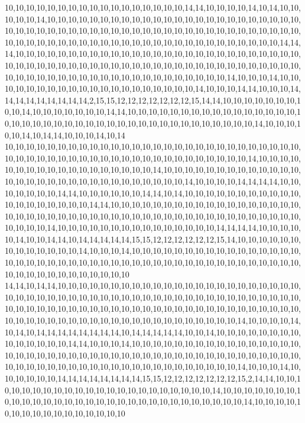 10,10,10,10,10,10,10,10,10,10,10,10,10,10,10,10,10,14,14,10,10,10,10,14,10,14,10,10,10,10,10,14,10,10,10,10,10,10,10,10,10,10,10,10,10,10,10,10,10,10,10,10,10,10,10,10,10,10,10,10,10,10,10,10,10,10,10,10,10,10,10,10,10,10,10,10,10,10,10,10,10,10,10,10,10,10,10,10,10,10,10,10,10,10,10,10,10,10,10,10,10,10,10,10,10,10,10,10,10,10,14,14,14,10,10,10,10,10,10,10,10,10,10,10,10,10,10,10,10,10,10,10,10,10,10,10,10,10,10,10,10,10,10,10,10,10,10,10,10,10,10,10,10,10,10,10,10,10,10,10,10,10,10,10,10,10,10,10,10,10,10,10,10,10,10,10,10,10,10,10,10,10,10,10,10,10,10,10,10,14,10,10,10,14,10,10,10,10,10,10,10,10,10,10,10,10,10,10,10,10,10,10,10,10,14,10,10,10,14,14,10,10,10,14,14,14,14,14,14,14,14,14,2,15,15,12,12,12,12,12,12,12,15,14,14,10,10,10,10,10,10,10,10,10,14,10,10,10,10,10,10,10,14,14,10,10,10,10,10,10,10,10,10,10,10,10,10,10,10,10,10,10,10,10,10,10,10,10,10,10,10,10,10,10,10,10,10,10,10,10,10,10,10,10,14,10,10,10,10,10,14,10,14,14,10,10,10,14,10,14
10,10,10,10,10,10,10,10,10,10,10,10,10,10,10,10,10,10,10,10,10,10,10,10,10,10,10,10,10,10,10,10,10,10,10,10,10,10,10,10,10,10,10,10,10,10,10,10,10,10,10,14,10,10,10,10,10,10,10,10,10,10,10,10,10,10,10,10,10,10,14,10,10,10,10,10,10,10,10,10,10,10,10,10,10,10,10,10,10,10,10,10,10,10,10,10,10,10,10,10,10,14,10,10,10,10,14,14,14,14,10,10,10,10,10,10,10,14,14,10,10,10,10,10,10,14,14,10,14,10,10,10,10,10,10,10,10,10,10,10,10,10,10,10,10,10,10,10,14,14,10,10,10,10,10,10,10,10,10,10,10,10,10,10,10,10,10,10,10,10,10,10,10,10,10,10,10,10,10,10,10,10,10,10,10,10,10,10,10,10,10,10,10,10,10,10,10,10,10,10,14,10,10,10,10,10,10,10,10,10,10,10,10,10,10,10,14,14,14,14,10,10,10,10,10,14,10,10,14,14,10,14,14,14,14,14,15,15,12,12,12,12,12,12,15,14,10,10,10,10,10,10,10,10,10,10,10,10,10,14,10,10,10,14,10,10,10,10,10,10,10,10,10,10,10,10,10,10,10,10,10,10,10,10,10,10,10,10,10,10,10,10,10,10,10,10,10,10,10,10,10,10,10,10,10,10,10,10,10,10,10,10,10,10,10,10,10,10,10,10
14,14,10,14,14,10,10,10,10,10,10,10,10,10,10,10,10,10,10,10,10,10,10,10,10,10,10,10,10,10,10,10,10,10,10,10,10,10,10,10,10,10,10,10,10,10,10,10,10,10,10,10,10,10,10,10,10,10,10,10,10,10,10,10,10,10,10,10,10,10,10,10,10,10,10,10,10,10,10,10,10,10,10,10,10,10,10,10,10,10,10,10,10,10,10,10,10,10,10,10,10,10,10,10,10,10,14,10,10,10,10,14,10,14,10,14,14,14,14,14,14,14,14,10,14,14,14,14,14,10,10,14,10,10,10,10,10,10,10,10,10,10,10,10,10,10,14,14,10,10,10,14,10,10,10,10,10,10,10,10,10,10,10,10,10,10,10,10,10,10,10,10,10,10,10,10,10,10,10,10,10,10,10,10,10,10,10,10,10,10,10,10,10,10,10,10,10,10,10,10,10,10,10,10,10,10,10,10,10,10,10,10,10,10,10,10,10,10,14,10,10,10,14,10,10,10,10,10,10,14,14,14,14,14,14,14,14,15,15,12,12,12,12,12,12,12,15,2,14,14,10,10,10,10,10,10,10,10,10,10,10,10,10,10,10,10,10,10,10,10,10,10,14,10,10,10,10,10,10,10,10,10,10,10,10,10,10,10,10,10,10,10,10,10,10,10,10,10,10,10,10,10,10,14,10,10,10,10,10,10,10,10,10,10,10,10,10,10,10,10

